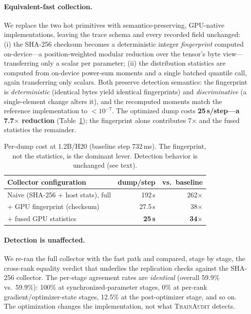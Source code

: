 \paragraph{Equivalent-fast collection.} We replace the two hot primitives with semantics-preserving, GPU-native implementations, leaving the trace schema and every recorded field unchanged: (i) the SHA-256 checksum becomes a deterministic integer \emph{fingerprint} computed on-device---a position-weighted modular reduction over the tensor's byte view---transferring only a scalar per parameter; (ii) the distribution statistics are computed from on-device power-sum moments and a single batched quantile call, again transferring only scalars. Both preserve detection semantics: the fingerprint is \emph{deterministic} (identical bytes yield identical fingerprints) and \emph{discriminative} (a single-element change alters it), and the recomputed moments match the reference implementation to $<10^{-7}$. The optimized dump costs \textbf{25\,s/step---a 7.7$\times$ reduction} (Table~\ref{tab:overhead}); the fingerprint alone contributes 7$\times$ and the fused statistics the remainder.

\begin{table}[t]
\centering\small
\caption{Per-dump cost at 1.2B/H20 (baseline step 732\,ms). The fingerprint, not the statistics, is the dominant lever. Detection behavior is unchanged (see text).}
\label{tab:overhead}
\begin{tabular}{@{}lrr@{}}
\toprule
Collector configuration & dump/step & vs.\ baseline \\
\midrule
Naive (SHA-256 + host stats), full   & 192\,s & 262$\times$ \\
\quad + GPU fingerprint (checksum)   & 27.5\,s & 38$\times$ \\
\quad + fused GPU statistics         & \textbf{25\,s} & \textbf{34$\times$} \\
\bottomrule
\end{tabular}
\end{table}

\paragraph{Detection is unaffected.} We re-ran the full collector with the fast path and compared, stage by stage, the cross-rank equality verdict that underlies the replication checks against the SHA-256 collector. The per-stage agreement rates are \emph{identical} (overall 59.9\% vs.\ 59.9\%): 100\% at synchronized-parameter stages, 0\% at per-rank gradient/optimizer-state stages, 12.5\% at the post-optimizer stage, and so on. The optimization changes the implementation, not what \textsc{TrainAudit} detects.

